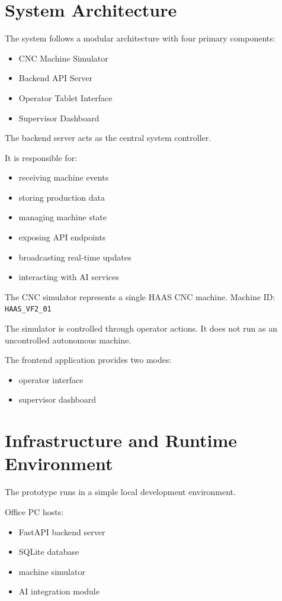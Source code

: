 \documentclass[11pt]{article}
\begin{document}
\section{System Architecture}
The system follows a modular architecture with four primary components:
\begin{itemize}
\item CNC Machine Simulator
\item Backend API Server
\item Operator Tablet Interface
\item Supervisor Dashboard
\end{itemize}

The backend server acts as the central system controller.

It is responsible for:
\begin{itemize}
\item receiving machine events
\item storing production data
\item managing machine state
\item exposing API endpoints
\item broadcasting real-time updates
\item interacting with AI services
\end{itemize}

The CNC simulator represents a single HAAS CNC machine. Machine ID: \texttt{HAAS\_VF2\_01}

The simulator is controlled through operator actions. It does not run as an uncontrolled autonomous machine.

The frontend application provides two modes:
\begin{itemize}
\item operator interface
\item supervisor dashboard
\end{itemize}

\section{Infrastructure and Runtime Environment}
The prototype runs in a simple local development environment.

Office PC hosts:
\begin{itemize}
\item FastAPI backend server
\item SQLite database
\item machine simulator
\item AI integration module
\end{itemize}
\end{document}

